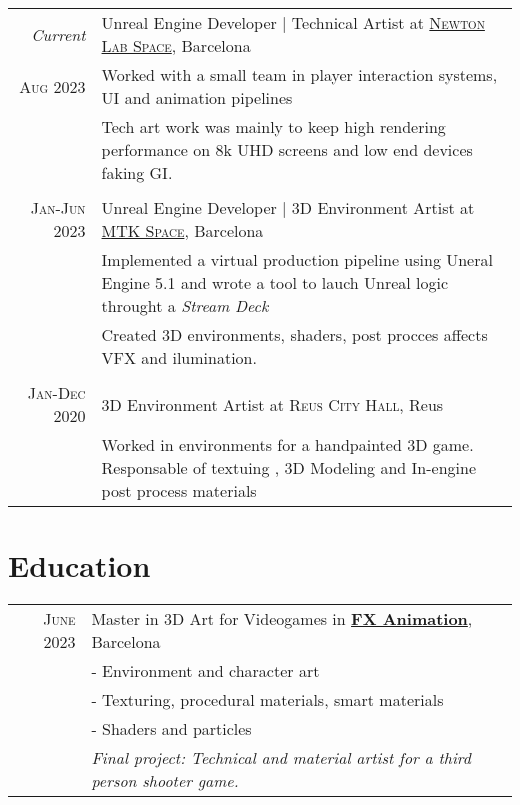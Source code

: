 \documentclass[a4paper,10pt]{article} %
\begin{document}
\begin{tabular}{r|p{11cm}}
\emph{Current} &  Unreal Engine Developer | Technical Artist at \href{https://www.newtonlabspace.com}{\textsc{Newton Lab Space}}, Barcelona \\
\textsc{Aug 2023} & \footnotesize{Worked with a small team in player interaction systems, UI and animation pipelines}\\
& \footnotesize{Tech art work was mainly to keep high rendering performance on 8k UHD screens and low end devices faking GI.}\\
\multicolumn{2}{c}{} \\


\textsc{Jan-Jun 2023} & Unreal Engine Developer | 3D Environment Artist at \href{https://mtkspace.com/home/}{\textsc{MTK Space}}, Barcelona \emph{}\\
& \footnotesize{Implemented a virtual production pipeline using Uneral Engine 5.1 and wrote a tool to lauch Unreal logic throught a \textit{Stream Deck}}\\
& \footnotesize{Created 3D environments, shaders, post procces affects VFX and ilumination.}\\
\multicolumn{2}{c}{} \\


\textsc{Jan-Dec 2020} & 3D Environment Artist at \textsc{Reus City Hall}, Reus \emph{}\\
& \footnotesize{Worked in environments for a handpainted 3D game. Responsable of textuing , 3D Modeling and In-engine post process materials}
\end{tabular}


\section{Education}

\begin{tabular}{rl}	
\textsc{June} 2023 & Master in 3D Art for Videogames in \href{https://www.fxbarcelonafilmschool.com/}{\textbf{FX Animation}}, Barcelona\\
& \footnotesize{- Environment and character art}\\
& \footnotesize{- Texturing, procedural materials, smart materials}\\
& \footnotesize{- Shaders and particles}\\
& \emph{Final project: Technical and material artist for a third person shooter game.}\\
\end{tabular}
\end{document}
